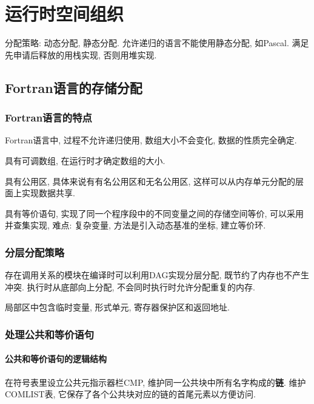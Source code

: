 \chapter{运行时空间组织}

    分配策略: 动态分配, 静态分配. 允许递归的语言不能使用静态分配, 如Pascal. 满足先申请后释放的用栈实现, 否则用堆实现.

    \section{Fortran语言的存储分配}

        \subsection{Fortran语言的特点}

            Fortran语言中, 过程不允许递归使用, 数组大小不会变化, 数据的性质完全确定.

            具有\textsf{可调数组}, 在运行时才确定数组的大小. 

            具有\textsf{公用区}, 具体来说有有名公用区和无名公用区, 这样可以从内存单元分配的层面上实现数据共享.

            具有\textsf{等价语句}, 实现了同一个程序段中的不同变量之间的存储空间等价, 可以采用并查集实现, 难点: 复杂变量, 方法是引入动态基准的坐标, 建立等价环.

        \subsection{分层分配策略}

            存在调用关系的模块在编译时可以利用DAG实现分层分配, 既节约了内存也不产生冲突. 执行时从底部向上分配, 不会同时执行时允许分配重复的内存.
            
            局部区中包含临时变量, 形式单元, 寄存器保护区和返回地址.

        \subsection{处理公共和等价语句}

            \subsubsection{公共和等价语句的逻辑结构}

                在符号表里设立公共元指示器栏CMP, 维护同一公共块中所有名字构成的\textbf{链}. 维护COMLIST表, 它保存了各个公共块对应的链的首尾元素以方便访问.

